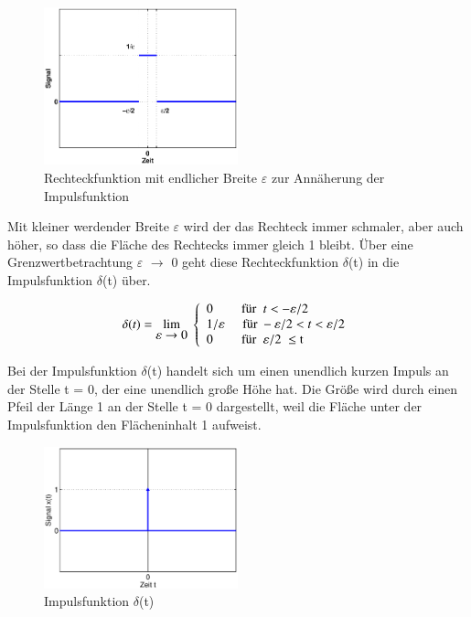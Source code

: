 \begin{figure}[ht]
  \centerline{\includegraphics[width=0.5\textwidth]{Kapitel1/Bilder/image11}}
  \caption{Rechteckfunktion mit endlicher Breite $\varepsilon$ zur Ann\"{a}herung der Impulsfunktion}
  \label{fig:NaehrungImpulsfunktion}
\end{figure}

\noindent Mit kleiner werdender Breite $\varepsilon$ wird der das Rechteck immer schmaler, aber auch h\"{o}her, so dass die Fl\"{a}che des Rechtecks immer gleich 1 bleibt. \"{U}ber eine Grenzwertbetrachtung $\varepsilon$ $\rightarrow$ 0 geht diese Rechteckfunktion $\delta$(t) in die Impulsfunktion $\delta$(t) \"{u}ber.

\begin{equation}\label{eq:onethirtysix}
\delta (t)={\lim\limits_{\displaystyle \varepsilon \to 0}} {\rm \; }\left\{\begin{array}{l} 
{0 \qquad \text{ für } \; t<-\varepsilon /2} \\
{1/\varepsilon \quad \, \text{ für } - \varepsilon {\rm /2}<t<\varepsilon /2} \\ 
{0\qquad \text{ für } \; \varepsilon /2{\rm \; }\le {\rm t}} \end{array}\right.
\end{equation}


\noindent Bei der Impulsfunktion $\delta$(t) handelt sich um einen unendlich kurzen Impuls an der Stelle t = 0, der eine unendlich gro{\ss}e H\"{o}he hat. Die Gr\"{o}{\ss}e wird durch einen Pfeil der L\"{a}nge 1 an der Stelle t = 0 dargestellt, weil die Fl\"{a}che unter der Impulsfunktion den Fl\"{a}cheninhalt 1 aufweist. 

\begin{figure}[ht]
  \centerline{\includegraphics[width=0.5\textwidth]{Kapitel1/Bilder/image12}}
  \caption{Impulsfunktion $\delta$(t)}
  \label{fig:Impulsfunktion}
\end{figure}

